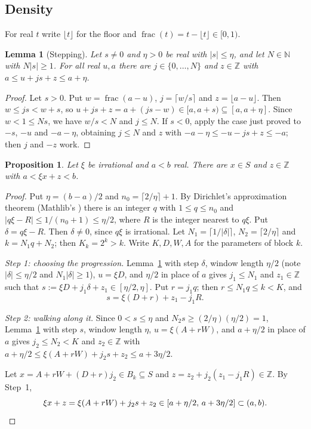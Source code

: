 \documentclass[11pt]{amsart}
\theoremstyle{plain}
\newtheorem{lemma}[theorem]{Lemma}
\newtheorem{proposition}[theorem]{Proposition}
\theoremstyle{definition}
\newcommand{\N}{\mathbb{N}}
\newcommand{\Z}{\mathbb{Z}}
\newcommand{\frc}{\operatorname{frac}}
\begin{document}
\subsection{Density}
For real $t$ write $\lfloor t\rfloor$ for the floor and $\frc(t)=t-\lfloor t\rfloor\in[0,1)$.

\begin{lemma}[Stepping]\label{lem:step}
Let $s\ne0$ and $\eta>0$ be real with $|s|\le\eta$, and let $N\in\N$ with $N|s|\ge1$. For all real $u,a$ there are $j\in\{0,\dots,N\}$ and $z\in\Z$ with $a\le u+js+z\le a+\eta$.
\end{lemma}

\begin{proof}
Let $s>0$. Put $w=\frc(a-u)$, $j=\lceil w/s\rceil$ and $z=\lfloor a-u\rfloor$. Then $w\le js<w+s$, so $u+js+z=a+(js-w)\in[a,a+s)\subseteq[a,a+\eta]$. Since $w<1\le Ns$, we have $w/s<N$ and $j\le N$.
If $s<0$, apply the case just proved to $-s$, $-u$ and $-a-\eta$, obtaining $j\le N$ and $z$ with $-a-\eta\le-u-js+z\le-a$; then $j$ and $-z$ work.
\end{proof}

\begin{proposition}\label{prop:dense}
Let $\xi$ be irrational and $a<b$ real. There are $x\in S$ and $z\in\Z$ with $a<\xi x+z<b$.
\end{proposition}

\begin{proof}
Put $\eta=(b-a)/2$ and $n_0=\lceil2/\eta\rceil+1$.
By Dirichlet's approximation theorem (Mathlib's ) there is an integer $q$ with $1\le q\le n_0$ and $|q\xi-R|\le1/(n_0+1)\le\eta/2$, where $R$ is the integer nearest to $q\xi$.
Put $\delta=q\xi-R$. Then $\delta\ne0$, since $q\xi$ is irrational.
Let $N_1=\lceil1/|\delta|\rceil$, $N_2=\lceil2/\eta\rceil$ and $k=N_1q+N_2$; then $K_k=2^k>k$. Write $K,D,W,A$ for the parameters of block $k$.

\emph{Step 1: choosing the progression.}
Lemma~\ref{lem:step} with step $\delta$, window length $\eta/2$ (note $|\delta|\le\eta/2$ and $N_1|\delta|\ge1$), $u=\xi D$, and $\eta/2$ in place of $a$ gives $j_1\le N_1$ and $z_1\in\Z$ such that $s:=\xi D+j_1\delta+z_1\in[\eta/2,\eta]$. Put $r=j_1q$; then $r\le N_1q\le k<K$, and
\[
  s=\xi(D+r)+z_1-j_1R .
\]

\emph{Step 2: walking along it.}
Since $0<s\le\eta$ and $N_2s\ge(2/\eta)(\eta/2)=1$, Lemma~\ref{lem:step} with step $s$, window length $\eta$, $u=\xi(A+rW)$, and $a+\eta/2$ in place of $a$ gives $j_2\le N_2<K$ and $z_2\in\Z$ with $a+\eta/2\le\xi(A+rW)+j_2s+z_2\le a+3\eta/2$.

Let $x=A+rW+(D+r)j_2\in B_k\subseteq S$ and $z=z_2+j_2(z_1-j_1R)\in\Z$. By Step~1,
\[
  \xi x+z=\xi(A+rW)+j_2s+z_2\in[a+\eta/2,\,a+3\eta/2]\subset(a,b). \qedhere
\]
\end{proof}
\end{document}
